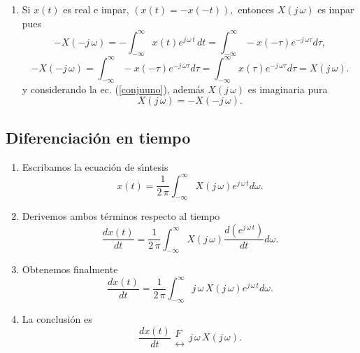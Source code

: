 \begin{enumerate}
\item  Si $x\left( t\right) $ es real e impar, $\left( x\left( t\right)
=-x\left( -t\right) \right) ,$ entonces $X\left( j \, \omega \right) $ es impar
pues 
\begin{equation}
-X\left( -j \, \omega \right) =-\int_{-\infty }^{\infty }x\left( t\right)
e^{j \, \omega \, t} \, dt=\int_{-\infty }^{\infty }-x\left( -\tau \right) e^{-j \, \omega
\tau }d\tau ,
\end{equation}
\begin{equation}
-X\left( -j \, \omega \right) =\int_{-\infty }^{\infty }-x\left( -\tau \right)
e^{-j \, \omega \tau }d\tau =\int_{-\infty }^{\infty }x\left( \tau \right)
e^{-j \, \omega \tau }d\tau =X\left( j \, \omega \right) .
\end{equation}
y considerando la ec. (\ref{conjuuno}), adem\'{a}s $X\left( j \, \omega \right) $
es imaginaria pura 
\begin{equation}
X\left( j \, \omega \right) =-X\left( -j \, \omega \right).
\end{equation}
\end{enumerate}

\subsection{Diferenciaci\'{o}n en tiempo}

\begin{enumerate}
\item Escribamos la ecuaci\'{o}n de s\'{\i}ntesis
\begin{equation}
x\left( t\right) =\frac{1}{2 \, \pi }\int_{-\infty }^{\infty }X\left( j \, \omega
\right) e^{j \, \omega \, t}d\omega .
\end{equation}

\item Derivemos ambos t\'{e}rminos respecto al tiempo
\begin{equation}
\frac{dx\left( t\right) }{dt}=\frac{1}{2 \, \pi }\int_{-\infty }^{\infty
}X\left( j \, \omega \right) \frac{d\left( e^{j \, \omega \, t}\right) }{dt}d\omega.
\end{equation}

\item Obtenemos finalmente
\begin{equation}
\frac{dx\left( t\right) }{dt}= \frac{1}{2 \, \pi }\int_{-\infty
}^{\infty }j \, \omega \, X\left( j \, \omega \right) e^{j \, \omega \, t}d\omega.
\end{equation}

\item La conclusi\'{o}n es 
\begin{equation}
\frac{dx\left( t\right) }{dt} 
\begin{array}{l}
F \\ 
\leftrightarrow
\end{array}
j \, \omega \, X\left( j \, \omega \right) .
\end{equation}

\end{enumerate}


